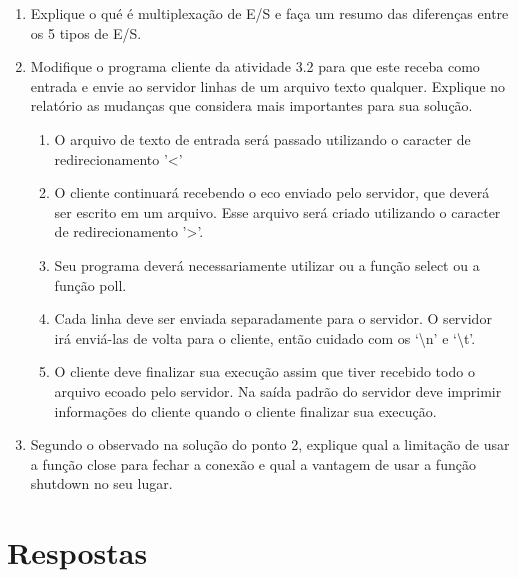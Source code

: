 \documentclass[12pt,a4paper]{report}
\begin{document}
\begin{enumerate}
    \item Explique o qué é multiplexação de E/S e faça um resumo das diferenças entre os 5 tipos de E/S.

    \item Modifique o programa cliente da atividade 3.2 para que este receba como entrada e envie ao servidor linhas de um arquivo texto qualquer. Explique no relatório as mudanças que considera mais importantes para sua solução.
    \begin{enumerate}
        \item O arquivo de texto de entrada será passado utilizando o caracter de
        redirecionamento '<'
        \item O cliente continuará recebendo o eco enviado pelo servidor, que deverá ser
        escrito em um arquivo. Esse arquivo será criado utilizando o caracter de
        redirecionamento '>'.
        \item Seu programa deverá necessariamente utilizar ou a função select ou a função
        poll.
        \item Cada linha deve ser enviada separadamente para o servidor. O servidor irá
        enviá-las de volta para o cliente, então cuidado com os ‘\textbackslash n’ e ‘\textbackslash t’.
        \item O cliente deve finalizar sua execução assim que tiver recebido todo o arquivo
        ecoado pelo servidor. Na saída padrão do servidor deve imprimir informações
        do cliente quando o cliente finalizar sua execução.
    \end{enumerate}
    
    \item Segundo o observado na solução do ponto 2, explique qual a limitação de usar a função close para fechar a conexão e qual a vantagem de usar a função shutdown no seu lugar.
\end{enumerate}

\section{Respostas}
\end{document}
